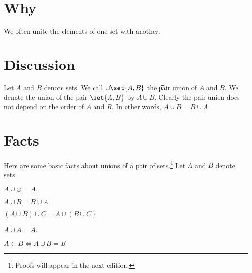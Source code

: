 

\section*{Why}

We often unite the elements of one set with another.

\section*{Discussion}

Let $A$ and $B$ denote sets.
We call $\cup \set{A, B}$ the \t{pair union} of $A$ and $B$.
We denote the union of the pair $\set{A, B}$ by $A \cup B$.
Clearly the pair union does not depend on the order of $A$ and $B$.
In other words, $A \cup B = B \cup A$.

\section*{Facts}

Here are some basic facts about unions of a pair of sets.\footnote{Proofs will appear in the next edition.}
Let $A$ and $B$ denote sets.

\begin{proposition}

\label{pair_unions:identity_element}$A \cup \varnothing = A$
\end{proposition}

\begin{proposition}[Commutativity]
$A \cup B = B \cup A$
\end{proposition}

\begin{proposition}[Commutativity]
$(A \cup B) \cup C = A \cup (B \cup C)$
\end{proposition}

\begin{proposition}[Idempotence]
$A \cup A = A$.
\end{proposition}

\begin{proposition}
$A \subset B \iff A \cup B = B$
\end{proposition}

\blankpage